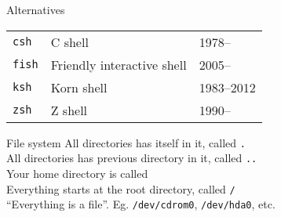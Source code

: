 \documentclass{beamer}
\let\tt\texttt
\let\tilde\texttildelow
\begin{document}
\begin{frame}{Alternatives}
        \begin{tabular}{p{} p{} p{}}
                \tt{csh}        & C shell   & 1978--  \\
                \tt{fish}       & Friendly interactive shell &  2005-- \\
                \tt{ksh}        & Korn shell & 1983--2012 \\
                \tt{zsh}        & Z shell & 1990--  \\
        \end{tabular}
\end{frame}

\begin{frame}{File system}
        All directories has itself in it, called \tt{.}                \\
        All directories has previous directory in it, called \tt{..}   \\
        Your home directory is called \tilde                           \\
        Everything starts at the root directory, called \tt{/}         \\
        ``Everything is a file''. Eg. \tt{/dev/cdrom0}, \tt{/dev/hda0}, etc.
\end{frame}
\end{document}
